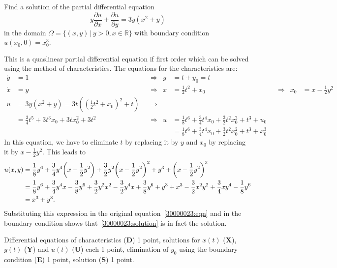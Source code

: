 Find a solution of the partial differential equation
\begin{equation}
y
\frac{\partial u}{\partial x}
+
\frac{\partial u}{\partial y}
=
3y(x^2+y)
\label{30000023:eqn}
\end{equation}
in the domain $\Omega=\{(x,y)\,|\, y>0, x\in\mathbb{R}\}$ with boundary 
condition $u(x_0,0) = x_0^3$.

\begin{loesung}
This is a quaslinear partial differential equation if first order which
can be solved using the method of characteristics.
The equations for the characteristics are:
\begin{align*}
\dot{y} &= 1
&&\Rightarrow&
y &= t+y_0 = t
\\
\dot{x} &= y
&&\Rightarrow&
x
&=
{\textstyle\frac12}t^2+x_0
&&\Rightarrow&
x_0 &= x-{\textstyle\frac12}y^2
\\
\dot{u} &= 3y(x^2+y)=3t(
({\textstyle\frac12}t^2+x_0)^2
+t)
&&\Rightarrow&
\\
&=
{\textstyle\frac34}t^5 + 3 t^3x_0 + 3tx_0^2 +3t^2
&&\Rightarrow&
u
&=
{\textstyle \frac{1}{8}} t^6
+{\textstyle\frac34}t^4x_0
+{\textstyle\frac32}t^2x_0^2 + t^3 + u_0
\\
&&&&
&=
{\textstyle \frac{1}{8}} t^6
+{\textstyle\frac34}t^4x_0
+{\textstyle\frac32}t^2x_0^2 + t^3 + x_0^3
\end{align*}
In this equation, we have to eliminate $t$ by replacing it by $y$ and
$x_0$ by replacing it by $x-\frac12y^2$.
This leads to
\begin{align}
u(x,y)
&=
\frac{1}{8}y^6
+\frac34y^4\biggl(x-\frac12y^2\biggr)
+\frac32y^2\biggl(x-\frac12y^2\biggr)^2
+y^3
+\biggl(x-\frac12y^2\biggr)^3
\notag
\\
&=
\frac1{8}y^6
+
\frac{3}{4}y^4x - \frac38y^6
+\frac32y^2x^2-\frac32y^4x +\frac{3}{8}y^6
+y^3
+x^3-\frac32x^2y^2+\frac34xy^4-\frac18y^6
\notag
\\
&=
x^3 + y^3.
\label{30000023:solution}
\end{align}
Substituting this expression in the original equation~\eqref{30000023:eqn}
and in the boundary condition shows that~\eqref{30000023:solution}
is in fact the solution.
\end{loesung}

\begin{bewertung}
Differential equations of characteristics ({\bf D}) 1 point,
solutions for $x(t)$ ({\bf X}), $y(t)$ ({\bf Y}) and $u(t)$ ({\bf U})
each 1 point,
elimination of $y_0$ using the boundary condition ({\bf E}) 1 point,
solution ({\bf S}) 1 point.
\end{bewertung}
